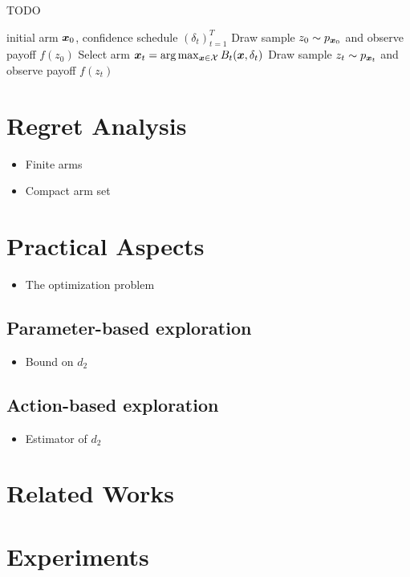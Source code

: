 \documentclass{article}
\makeatletter
\DeclareRobustCommand{\algoname}{TODO\@\xspace}
\makeatother
\begin{document}
\begin{algorithm}[t]
	\caption{\algoname}
	\label{alg:1}
	\begin{algorithmic}[1]
	 initial arm $\boldsymbol{x}_0$, confidence schedule $(\delta_t)_{t=1}^T$
	\STATE Draw sample $z_0\sim p_{\boldsymbol{x}_0}$ and observe payoff $f(z_0)$
		\STATE Select arm $\boldsymbol{x}_t = \arg\max_{\boldsymbol{x}\in\mathcal{X}}B_t(\boldsymbol{x},\delta_t)$
		\STATE Draw sample $z_t\sim p_{\boldsymbol{x}_t}$ and observe payoff $f(z_t)$
	\ENDFOR
	\end{algorithmic}
\end{algorithm}

\section{Regret Analysis}\label{sec:regret}
\begin{itemize}
	\item Finite arms
	\item Compact arm set
\end{itemize}

\section{Practical Aspects}\label{sec:practical}
\begin{itemize}
	\item The optimization problem
\end{itemize}
\subsection{Parameter-based exploration}
\begin{itemize}
	\item Bound on $d_2$
\end{itemize}
\subsection{Action-based exploration}
\begin{itemize}
	\item Estimator of $d_2$
\end{itemize}

\section{Related Works}

\section{Experiments}
\end{document}
